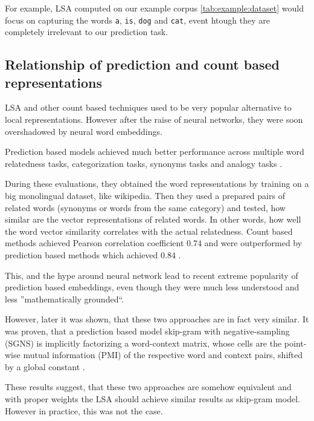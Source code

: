     For example, LSA computed on our example corpus \ref{tab:example:dataset} would focus on capturing the words \texttt{a}, \texttt{is}, \texttt{dog} and \texttt{cat},
    event htough they are completely irrelevant to our prediction task.
    
    \* %
    
    \subsection{Relationship of prediction and count based representations}
        
    LSA and other count based techniques used to be very popular alternative to local representations.
    However after the raise of neural networks, they were soon overshadowed by neural word embeddings.
    
    Prediction based models achieved much better performance across multiple word relatedness tasks, categorization tasks, synonyms tasks and analogy tasks \cite{baroni2014don}. %
    
    During these evaluations, they obtained the word representations by training on a big monolingual dataset, like wikipedia.
    Then they used a prepared pairs of related words (synonyms or words from the same category) and tested,
    how similar are the vector representations of related words. 
    In other words, how well the word vector similarity correlates with the actual relatedness. 
    Count based methods achieved Pearson correlation coefficient $0.74$ and were outperformed by prediction based methods which achieved $0.84$ \cite{baroni2014don}.
    
    This, and the hype around neural network lead to recent extreme popularity of prediction based embeddings,
    even though they were much less understood and less ''mathematically grounded``.
    
    However, later it was shown, that these two approaches are in fact very similar.
    It was proven, that a prediction based model skip-gram with negative-sampling (SGNS) 
    is implicitly factorizing a word-context matrix,
    whose cells are the point-wise mutual information (PMI) of the respective word and context pairs, 
    shifted by a global constant \cite{levy2014neural}. %
    
    These results suggest, that these two approaches are somehow equivalent and with proper weights the LSA should achieve similar results as skip-gram model. 
    However in practice, this was not the case.
    
